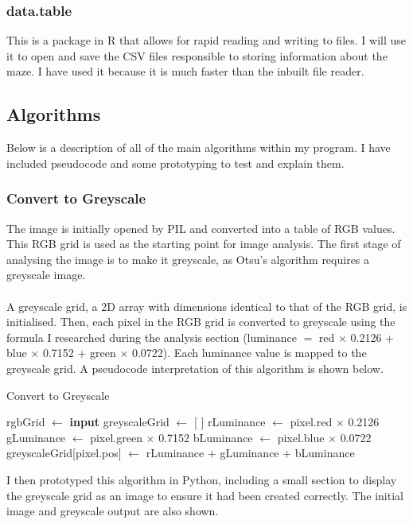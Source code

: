 \documentclass[titlepage]{article}
\begin{document}
\subsubsection{data.table}
This is a package in R that allows for rapid reading and writing to files. I will use it to open and save the CSV files responsible to storing information about the maze. I have used it because it is much faster than the inbuilt file reader.

\subsection{Algorithms}
Below is a description of all of the main algorithms within my program. I have included pseudocode and some prototyping to test and explain them.

\subsubsection{Convert to Greyscale}

The image is initially opened by PIL and converted into a table of RGB values. This RGB grid is used as the starting point for image analysis. The first stage of analysing the image is to make it greyscale, as Otsu's algorithm requires a greyscale image. 
\\\\
A greyscale grid, a 2D array with dimensions identical to that of the RGB grid, is initialised. Then, each pixel in the RGB grid is converted to greyscale using the formula I researched during the analysis section (luminance $=$ red $\times$ 0.2126 + blue $\times$ 0.7152 + green $\times$ 0.0722). Each luminance value is mapped to the greyscale grid. A pseudocode interpretation of this algorithm is shown below. 
\begin{algorithm}
\caption{Convert to Greyscale}
\begin{algorithmic}[1]
	\State rgbGrid $\gets$ \textbf{input}
    	\State greyscaleGrid $\gets$ [ ]
        		\State rLuminance $\gets$ pixel.red $\times$ 0.2126
        		\State gLuminance $\gets$ pixel.green $\times$ 0.7152
        		\State bLuminance $\gets$ pixel.blue $\times$ 0.0722
    		\State greyscaleGrid[pixel.pos] $\gets$ rLuminance + gLuminance + bLuminance
   	\EndFor
\end{algorithmic}
\end{algorithm}

I then prototyped this algorithm in Python, including a small section to display the greyscale grid as an image to ensure it had been created correctly. The initial image and greyscale output are also shown.
\end{document}
